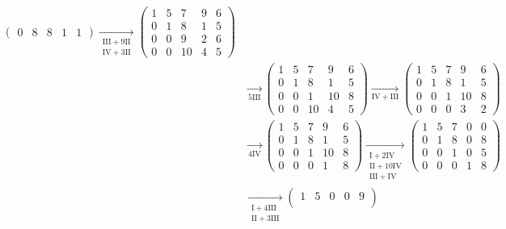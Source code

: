 \begin{bsp}
\begin{enumerate}[leftmargin=*]
\begin{align*}
\begin{pmatrix}
     0 & 8 & 8 & 1 & 1
    \end{pmatrix}
    \xrightarrow[\substack{\mathrm{III}+9\mathrm{II} \\ \mathrm{IV}+3\mathrm{II}}]{}
    \begin{pmatrix}
     1 & 5 &  7 & 9 & 6 \\
     0 & 1 &  8 & 1 & 5 \\
     0 & 0 &  9 & 2 & 6 \\
     0 & 0 & 10 & 4 & 5
    \end{pmatrix}
    \\
    &\xrightarrow[5\mathrm{III}]{}
    \begin{pmatrix}
     1 & 5 &  7 &  9 & 6 \\
     0 & 1 &  8 &  1 & 5 \\
     0 & 0 &  1 & 10 & 8 \\
     0 & 0 & 10 &  4 & 5
    \end{pmatrix}
    \xrightarrow[\mathrm{IV}+\mathrm{III}]{}
    \begin{pmatrix}
     1 & 5 & 7 &  9 & 6 \\
     0 & 1 & 8 &  1 & 5 \\
     0 & 0 & 1 & 10 & 8 \\
     0 & 0 & 0 &  3 & 2
    \end{pmatrix}
    \\
    &\xrightarrow[4\mathrm{IV}]{}
    \begin{pmatrix}
     1 & 5 & 7 &  9 & 6 \\
     0 & 1 & 8 &  1 & 5 \\
     0 & 0 & 1 & 10 & 8 \\
     0 & 0 & 0 &  1 & 8
    \end{pmatrix}
    \xrightarrow[\substack{\mathrm{I}+2\mathrm{IV} \\ \mathrm{II}+10\mathrm{IV} \\ \mathrm{III}+\mathrm{IV}}]{}
    \begin{pmatrix}
     1 & 5 & 7 & 0 & 0 \\
     0 & 1 & 8 & 0 & 8 \\
     0 & 0 & 1 & 0 & 5 \\
     0 & 0 & 0 & 1 & 8
    \end{pmatrix}
    \\
    &\xrightarrow[\substack{\mathrm{I}+4\mathrm{III} \\ \mathrm{II}+3\mathrm{III}}]{}
    \begin{pmatrix}
     1 & 5 & 0 & 0 & 9 \\

\end{pmatrix}
\end{align*}
\end{enumerate}
\end{bsp}
